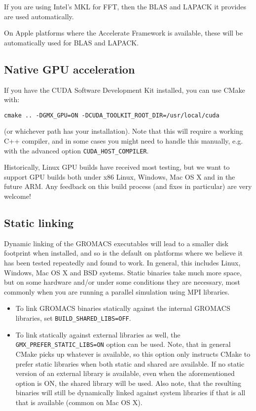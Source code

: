 \documentclass{article}[12pt,a4paper,twoside]
\newcommand{\gromacs}{GROMACS}
\newcommand{\cuda}{CUDA}
\newcommand{\mkl}{MKL}
\newcommand{\cmake}{CMake}
\newcommand{\fft}{FFT}
\newcommand{\blas}{BLAS}
\newcommand{\lapack}{LAPACK}
\begin{document}
If you are using Intel's \mkl{} for \fft{}, then the \blas{} and
\lapack{} it provides are used automatically.

On Apple platforms where the Accelerate Framework is available, these
will be automatically used for \blas{} and \lapack{}.

\subsection{Native GPU acceleration}
If you have the \cuda{} Software Development Kit installed, you can
use \cmake{} with:
\begin{verbatim}
cmake .. -DGMX_GPU=ON -DCUDA_TOOLKIT_ROOT_DIR=/usr/local/cuda
\end{verbatim}
(or whichever path has your installation). Note that this will require
a working C++ compiler, and in some cases you might need to handle
this manually, e.g. with the advanced option
\verb+CUDA_HOST_COMPILER+.

Historically, Linux GPU builds have received most testing, but we 
want to support GPU builds both under x86 Linux, Windows, Mac OS X and in the
future ARM. Any feedback on this build process (and fixes in particular) are very
welcome!

\subsection{Static linking}
Dynamic linking of the \gromacs{} executables will lead to a
smaller disk footprint when installed, and so is the default on
platforms where we believe it has been tested repeatedly and found to work.
In general, this includes Linux, Windows, Mac OS X and BSD systems.
Static binaries take much more space, but on some hardware and/or under
some conditions they are necessary, most commonly when you are running a parallel
simulation using MPI libraries. 

\begin{itemize}
\item To link \gromacs{} binaries
statically against the internal \gromacs{} libraries, set
\verb+BUILD_SHARED_LIBS=OFF+.
\item To link statically against external
libraries as well, the \verb+GMX_PREFER_STATIC_LIBS=ON+ option can be
used. Note, that in general \cmake{} picks up whatever is available,
so this option only instructs \cmake{} to prefer static libraries when
both static and shared are available. If no static version of an
external library is available, even when the aforementioned option is
ON, the shared library will be used. Also note, that the resulting
binaries will still be dynamically linked against system libraries if
that is all that is available (common on Mac OS X).
\end{itemize}
\end{document}
